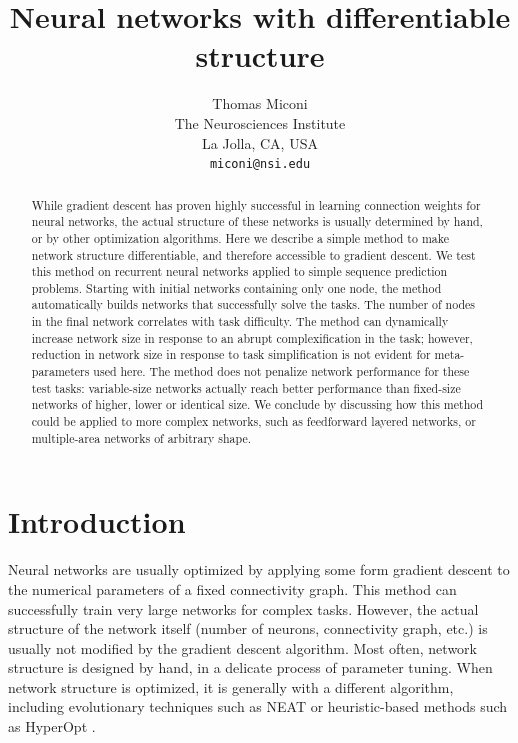 \documentclass{article}
\title{Neural networks with differentiable structure}
\author{
Thomas Miconi\\%
  The Neurosciences Institute\\
 La Jolla, CA, USA \\
  \texttt{miconi@nsi.edu} \\
}
\begin{document}
 
\maketitle

\begin{abstract}

While gradient descent has proven highly successful in learning connection
weights for neural networks, the actual structure of these networks is usually determined by hand, or by
other optimization algorithms.  Here we describe a simple method to make
network structure differentiable, and therefore accessible to gradient descent.
We test this method on recurrent neural networks applied to simple
sequence prediction problems. Starting with initial networks containing only
one node, the method automatically builds networks that successfully solve the
tasks. The number of nodes in the final network correlates with task
difficulty. The method can dynamically increase network size in response to an
abrupt complexification in the task; however, reduction in network size in
response to task simplification is not evident for meta-parameters used here.
The method does not penalize network performance for these test tasks:
variable-size networks actually reach better performance than fixed-size
networks of higher, lower or identical size. We conclude by discussing how this
method could be applied to more complex networks, such as feedforward layered
networks, or multiple-area networks of arbitrary shape.

\end{abstract}

\section{Introduction}

Neural networks are usually optimized by applying some form gradient descent to
the numerical parameters of a fixed connectivity graph. This method can
successfully train very large networks for complex tasks. However, the actual
structure of the network itself (number of neurons, connectivity graph, etc.) is usually not modified by the gradient
descent algorithm. Most often, network structure is designed by hand, in a delicate process of parameter tuning.
When network structure is optimized, it is generally with a different
algorithm, including evolutionary techniques such as NEAT \cite{Stanley2002-ug} or heuristic-based methods such as HyperOpt \cite{Yamins2014-us}.
\end{document}
